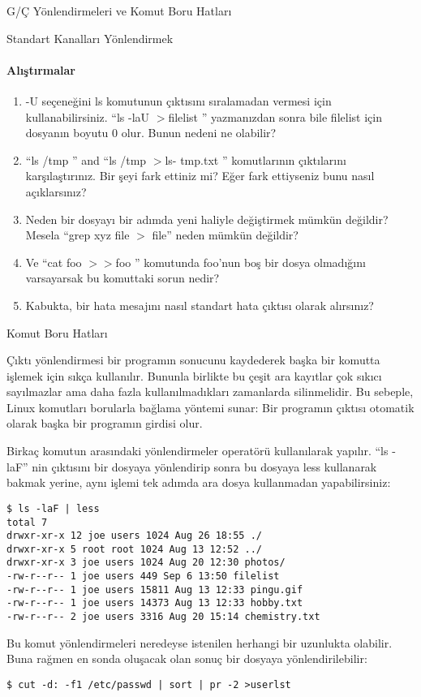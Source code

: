 \begin{section}{G/Ç Yönlendirmeleri ve Komut Boru Hatları}
\begin{subsection}{Standart Kanalları Yönlendirmek}
\paragraph{{\Huge{\PencilLeftDown}}Alıştırmalar}{
\begin{enumerate}
 \item -U seçeneğini ls komutunun çıktısını sıralamadan vermesi için kullanabilirsiniz. “ls -laU $>$filelist ” yazmanızdan sonra bile filelist için dosyanın boyutu 0 olur. Bunun nedeni ne olabilir?
 \item “ls /tmp ” and “ls /tmp $>$ls- tmp.txt ” komutlarının çıktılarını karşılaştırınız. Bir şeyi fark ettiniz mi? Eğer fark ettiyseniz bunu nasıl açıklarsınız? 
 \item Neden bir dosyayı bir adımda yeni haliyle değiştirmek mümkün değildir? Mesela “grep xyz file $>$ file” neden mümkün değildir?
\item Ve “cat foo $>>$foo ” komutunda foo'nun boş bir dosya olmadığını varsayarsak bu komuttaki sorun nedir?
\item Kabukta, bir hata mesajını nasıl standart hata çıktısı olarak alırsınız?
\end{enumerate}}
\end{subsection}
\begin{subsection}{Komut Boru Hatları}

Çıktı yönlendirmesi bir programın sonucunu kaydederek başka bir komutta işlemek için sıkça kullanılır. Bununla birlikte bu çeşit ara kayıtlar çok sıkıcı sayılmazlar ama daha fazla kullanılmadıkları zamanlarda silinmelidir. Bu sebeple, Linux komutları borularla bağlama yöntemi sunar: Bir programın çıktısı otomatik olarak başka bir programın girdisi olur.

Birkaç komutun arasındaki yönlendirmeler \textbar  operatörü kullanılarak yapılır.  “ls -laF” nin çıktısını bir dosyaya yönlendirip sonra bu dosyaya less kullanarak bakmak yerine, aynı işlemi tek adımda ara dosya kullanmadan yapabilirsiniz:
\footnotesize
\begin{verbatim}
$ ls -laF | less
total 7
drwxr-xr-x 12 joe users 1024 Aug 26 18:55 ./
drwxr-xr-x 5 root root 1024 Aug 13 12:52 ../
drwxr-xr-x 3 joe users 1024 Aug 20 12:30 photos/
-rw-r--r-- 1 joe users 449 Sep 6 13:50 filelist
-rw-r--r-- 1 joe users 15811 Aug 13 12:33 pingu.gif
-rw-r--r-- 1 joe users 14373 Aug 13 12:33 hobby.txt
-rw-r--r-- 2 joe users 3316 Aug 20 15:14 chemistry.txt
\end{verbatim}
\normalsize

Bu komut yönlendirmeleri neredeyse istenilen herhangi bir uzunlukta olabilir. Buna rağmen en sonda oluşacak olan sonuç bir dosyaya yönlendirilebilir:
\begin{verbatim}
$ cut -d: -f1 /etc/passwd | sort | pr -2 >userlst
\end{verbatim}


\end{subsection}
\end{section}
